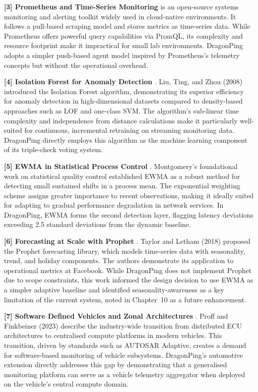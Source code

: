 \documentclass[12pt,a4paper,oneside]{report}
\begin{document}
\noindent \textbf{[3] Prometheus and Time-Series Monitoring} \cite{prometheus} is an open-source systems monitoring and alerting toolkit widely used in cloud-native environments. It follows a pull-based scraping model and stores metrics as time-series data. While Prometheus offers powerful query capabilities via PromQL, its complexity and resource footprint make it impractical for small lab environments. DragonPing adopts a simpler push-based agent model inspired by Prometheus's telemetry concepts but without the operational overhead.

\noindent \textbf{[4] Isolation Forest for Anomaly Detection} \cite{isolation_forest}. Liu, Ting, and Zhou (2008) introduced the Isolation Forest algorithm, demonstrating its superior efficiency for anomaly detection in high-dimensional datasets compared to density-based approaches such as LOF and one-class SVM. The algorithm's sub-linear time complexity and independence from distance calculations make it particularly well-suited for continuous, incremental retraining on streaming monitoring data. DragonPing directly employs this algorithm as the machine learning component of its triple-check voting system.

\noindent \textbf{[5] EWMA in Statistical Process Control} \cite{ewma}. Montgomery's foundational work on statistical quality control established EWMA as a robust method for detecting small sustained shifts in a process mean. The exponential weighting scheme assigns greater importance to recent observations, making it ideally suited for adapting to gradual performance degradation in network services. In DragonPing, EWMA forms the second detection layer, flagging latency deviations exceeding 2.5 standard deviations from the dynamic baseline.

\noindent \textbf{[6] Forecasting at Scale with Prophet} \cite{taylor2018forecasting}. Taylor and Letham (2018) proposed the Prophet forecasting library, which models time-series data with seasonality, trend, and holiday components. The authors demonstrate its application to operational metrics at Facebook. While DragonPing does not implement Prophet due to scope constraints, this work informed the design decision to use EWMA as a simpler adaptive baseline and identified seasonality-awareness as a key limitation of the current system, noted in Chapter~10 as a future enhancement.

\noindent \textbf{[7] Software Defined Vehicles and Zonal Architectures} \cite{sdv_autosar}. Proff and Finkbeiner (2023) describe the industry-wide transition from distributed ECU architectures to centralised compute platforms in modern vehicles. This transition, driven by standards such as AUTOSAR Adaptive, creates a demand for software-based monitoring of vehicle subsystems. DragonPing's automotive extension directly addresses this gap by demonstrating that a generalised monitoring platform can serve as a vehicle telemetry aggregator when deployed on the vehicle's central compute domain.
\end{document}
